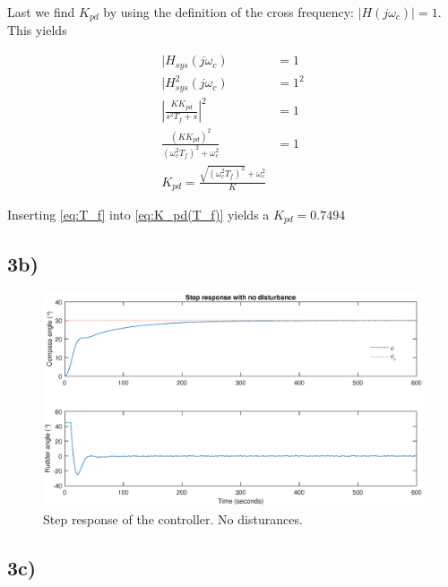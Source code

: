Last we find $K_{pd}$ by using the definition of the cross frequency: $|H(j\omega_c)| = 1$. This yields

\begin{subequations}
    \begin{align}
        |H_{sys}(j\omega_c) &= 1 \\
        |H_{sys}^2(j\omega_c) &= 1^2 \\
        \left | \frac{KK_{pd}}{s^2T_f+s} \right |^2 &= 1 \\
        \frac{(KK_{pd})^2}{(\omega_c^2 T_f)^2 + \omega_c^2} &= 1 \\
        K_{pd} = \frac{\sqrt{(\omega_c^2 T_f)^2} + \omega_c^2}{K} \label{eq:K_pd(T_f)}
    \end{align}
\end{subequations}

Inserting \cref{eq:T_f} into \cref{eq:K_pd(T_f)} yields a $K_{pd} = 0.7494$

\subsection{3b)}


\begin{figure}
    \centering
    \includegraphics[width=\textwidth]{images/oppg3/stepresp_no_disturbance.eps}
    \caption{Step response of the controller. No disturances.}
    \label{fig:step_no_dist}
\end{figure}

\subsection{3c)}


